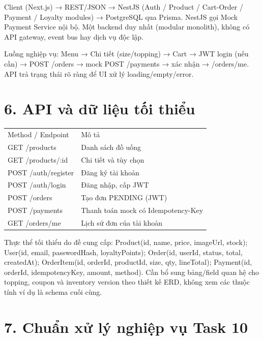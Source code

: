 \documentclass[11pt,a4paper,oneside]{report}
\begin{document}
Client (Next.js) → REST/JSON → NestJS (Auth / Product / Cart-Order / Payment / Loyalty modules) → PostgreSQL qua Prisma. NestJS gọi Mock Payment Service nội bộ. Một backend duy nhất (modular monolith), không có API gateway, event bus hay dịch vụ độc lập.

Luồng nghiệp vụ: Menu → Chi tiết (size/topping) → Cart → JWT login (nếu cần) → POST /orders → mock POST /payments → xác nhận → /orders/me. API trả trạng thái rõ ràng để UI xử lý loading/empty/error.

\section{\texorpdfstring{\textbf{6. API và dữ liệu tối thiểu}}{6. API và dữ liệu tối thiểu}}\label{05-techstack:api-vuxe0-dux1eef-liux1ec7u-tux1ed1i-thiux1ec3u}

\begin{longtable}[]{@{}
  >{\raggedright\arraybackslash}p{}
  >{\raggedright\arraybackslash}p{}@{}}
\toprule\noalign{}
\endhead
\bottomrule\noalign{}
\endlastfoot
Method / Endpoint & Mô tả \\
GET /products & Danh sách đồ uống \\
GET /products/:id & Chi tiết và tùy chọn \\
POST /auth/register & Đăng ký tài khoản \\
POST /auth/login & Đăng nhập, cấp JWT \\
POST /orders & Tạo đơn PENDING (JWT) \\
POST /payments & Thanh toán mock có Idempotency-Key \\
GET /orders/me & Lịch sử đơn của tài khoản \\
\end{longtable}

Thực thể tối thiểu do đề cung cấp: Product(id, name, price, imageUrl, stock); User(id, email, passwordHash, loyaltyPoints); Order(id, userId, status, total, createdAt); OrderItem(id, orderId, productId, size, qty, lineTotal); Payment(id, orderId, idempotencyKey, amount, method). Cần bổ sung bảng/field quan hệ cho topping, coupon và inventory version theo thiết kế ERD, không xem các thuộc tính ví dụ là schema cuối cùng.

\section{\texorpdfstring{\textbf{7. Chuẩn xử lý nghiệp vụ Task 10}}{7. Chuẩn xử lý nghiệp vụ Task 10}}\label{05-techstack:chuux1ea9n-xux1eed-luxfd-nghiux1ec7p-vux1ee5-task-10}
\end{document}
